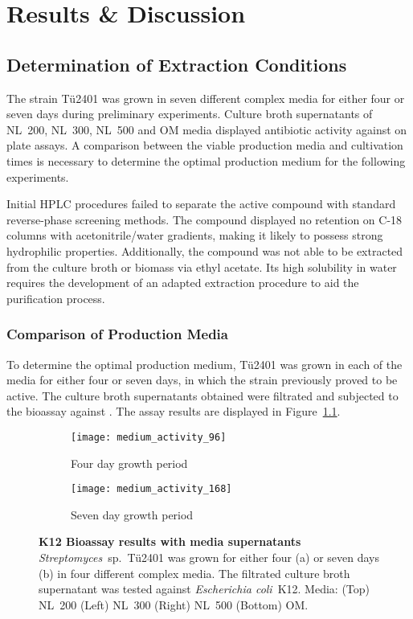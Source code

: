
\chapter{Results \& Discussion}

\section{Determination of Extraction Conditions} %
\label{sec:determination_of_extraction_conditions}

The strain Tü2401 was grown in seven different complex media for either four or seven days during preliminary experiments.
Culture broth supernatants of NL~200, NL~300, NL~500 and OM media displayed antibiotic activity against \coli  on plate assays.
A comparison between the viable production media and cultivation times is necessary to determine the optimal production medium for the following experiments.

Initial HPLC procedures failed to separate the active compound with standard reverse-phase screening methods. The compound displayed no retention on C-18 columns with acetonitrile/water gradients, making it likely to possess strong hydrophilic properties.
Additionally, the compound was not able to be extracted from the culture broth or biomass via ethyl acetate.
Its high solubility in water requires the development of an adapted extraction procedure to aid the purification process.

\subsection{Comparison of Production Media} %
\label{sub:comparison_of_production_media}

To determine the optimal production medium, Tü2401 was grown in each of the media for either four or seven days, in which the strain previously proved to be active.
The culture broth supernatants obtained were filtrated and subjected to the bioassay against \coli{}.
The assay results are displayed in Figure~\ref{fig:medium_activity}.

\begin{figure}[htbp]
	\centering
	\begin{subfigure}{0.4\textwidth}
		\texttt{[image: medium\_activity\_96]}
		\caption{Four day growth period}
	\end{subfigure}%
	\begin{subfigure}{0.4\textwidth}
		\texttt{[image: medium\_activity\_168]}
		\caption{Seven day growth period}
	\end{subfigure}
	\caption[K12 Bioassay results with media supernatants]{%
		\textbf{K12 Bioassay results with media supernatants} \textit{Streptomyces}~sp.~Tü2401 was grown for either four (a)
    or seven days (b) in four different complex media. The filtrated culture broth supernatant was tested against
    \textit{Escherichia coli}~K12. Media: (Top) NL~200 (Left) NL~300 (Right) NL~500 (Bottom) OM.}
	\label{fig:medium_activity}
\end{figure}

